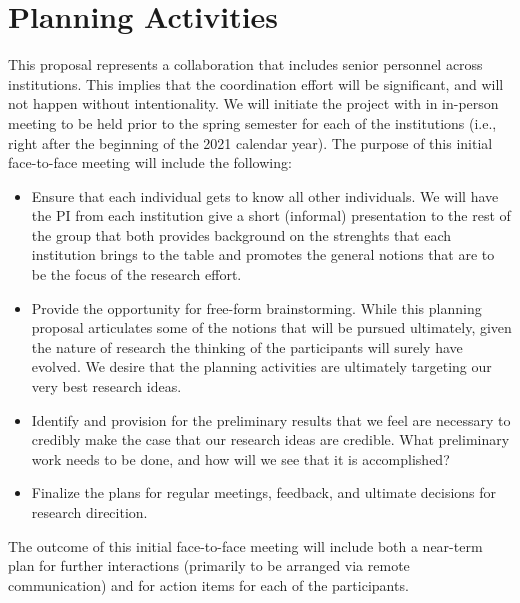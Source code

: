 \section{Planning Activities}
\label{sec:plan}

This proposal represents a collaboration that includes  senior personnel across  institutions. This implies that the coordination effort will be significant, and will not happen without intentionality.  We will initiate the project with in in-person meeting to be held prior to the spring semester for each of the institutions (i.e., right after the beginning of the 2021 calendar year). The purpose of this initial face-to-face meeting will include the following:
\begin{itemize}

\item Ensure that each individual gets to know all other individuals. We will have the PI from each institution give a short (informal) presentation to the rest of the group that both provides background on the strenghts that each institution brings to the table and promotes the general notions that are to be the focus of the research effort.

\item Provide the opportunity for free-form brainstorming. While this planning proposal articulates some of the notions that will be pursued ultimately, given the nature of research the thinking of the participants will surely have evolved. We desire that the planning activities are ultimately targeting our very best research ideas.

\item Identify and provision for the preliminary results that we feel are necessary to credibly make the case that our research ideas are credible. What preliminary work needs to be done, and how will we see that it is accomplished?

\item Finalize the plans for regular meetings, feedback, and ultimate decisions for research direcition.

\end{itemize}

The outcome of this initial face-to-face meeting will include both a near-term plan for further interactions (primarily to be arranged via remote communication) and for action items for each of the participants.